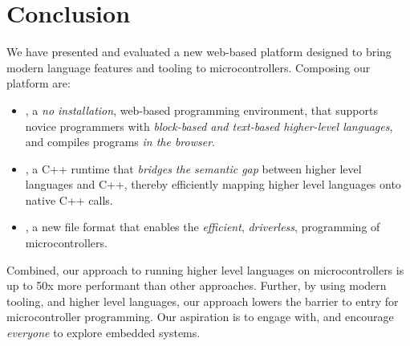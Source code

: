 \section{Conclusion}
\label{sec:conclude}

We have presented and evaluated a new web-based platform designed to bring modern language features and tooling to microcontrollers. Composing our platform are:

\begin{itemize}

\item \MCN, a \emph{no installation}, web-based programming environment, that supports novice programmers with \emph{block-based and text-based higher-level languages}, and compiles programs \emph{in the browser}.

\item \CON, a C++ runtime that \emph{bridges the semantic gap} between higher level languages and C++, thereby efficiently mapping higher level languages onto native C++ calls.

\item \UFN, a new file format that enables the \emph{efficient}, \emph{driverless}, programming of microcontrollers.

\end{itemize}

Combined, our approach to running higher level languages on microcontrollers is up to 50x more performant than other approaches. Further, by using modern tooling, and higher level languages, our approach lowers the barrier to entry for microcontroller programming. Our aspiration is to engage with, and encourage \emph{everyone} to explore embedded systems.
